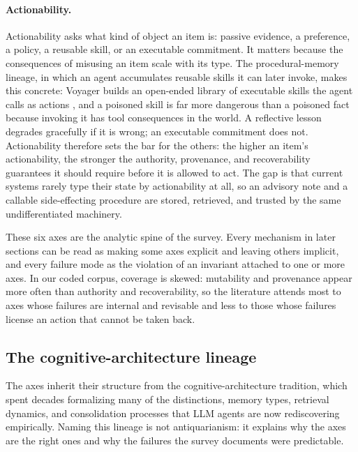 \paragraph{Actionability.} Actionability asks what kind of object an item is: passive evidence, a preference, a policy, a reusable skill, or an executable commitment. It matters because the consequences of misusing an item scale with its type. The procedural-memory lineage, in which an agent accumulates reusable skills it can later invoke, makes this concrete: Voyager builds an open-ended library of executable skills the agent calls as actions \citep{wang2023voyageropenendedembodiedagent}, and a poisoned skill is far more dangerous than a poisoned fact because invoking it has tool consequences in the world. A reflective lesson degrades gracefully if it is wrong; an executable commitment does not. Actionability therefore sets the bar for the others: the higher an item's actionability, the stronger the authority, provenance, and recoverability guarantees it should require before it is allowed to act. The gap is that current systems rarely type their state by actionability at all, so an advisory note and a callable side-effecting procedure are stored, retrieved, and trusted by the same undifferentiated machinery.

These six axes are the analytic spine of the survey. Every mechanism in later sections can be read as making some axes explicit and leaving others implicit, and every failure mode as the violation of an invariant attached to one or more axes. In our coded corpus, coverage is skewed: mutability and provenance appear more often than authority and recoverability, so the literature attends most to axes whose failures are internal and revisable and less to those whose failures license an action that cannot be taken back.

\subsection{The cognitive-architecture lineage}\label{subsec:lineage}

The axes inherit their structure from the cognitive-architecture tradition, which spent decades formalizing many of the distinctions, memory types, retrieval dynamics, and consolidation processes that LLM agents are now rediscovering empirically. Naming this lineage is not antiquarianism: it explains why the axes are the right ones and why the failures the survey documents were predictable.

